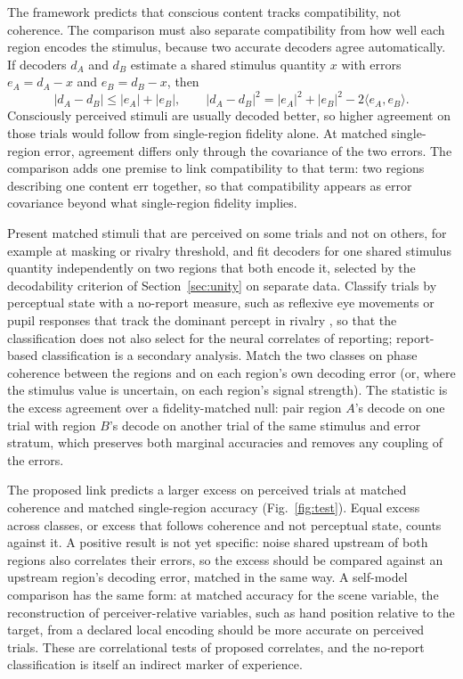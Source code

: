 \documentclass[12pt]{article}
\renewcommand{\cite}[1]{\citep{#1}}
\begin{document}
The framework predicts that conscious content tracks compatibility, not
coherence. The comparison must also separate compatibility from how well each
region encodes the stimulus, because two accurate decoders agree
automatically. If decoders $d_A$ and $d_B$ estimate a shared stimulus quantity
$x$ with errors $e_A=d_A-x$ and $e_B=d_B-x$, then
\begin{equation}
 |d_A-d_B|\leq|e_A|+|e_B|,
 \qquad
 |d_A-d_B|^2=|e_A|^2+|e_B|^2-2\langle e_A,e_B\rangle.
 \label{eq:agreement-decomposition}
\end{equation}
Consciously perceived stimuli are usually decoded better, so higher agreement
on those trials would follow from single-region fidelity alone. At matched
single-region error, agreement differs only through the covariance of the two
errors. The comparison adds one premise to link compatibility to that term:
two regions describing one content err together, so that compatibility
appears as error covariance beyond what single-region fidelity implies.

Present matched stimuli that are perceived on some trials and not on others,
for example at masking or rivalry threshold, and fit decoders for one shared
stimulus quantity independently on two regions that both encode it, selected by the decodability criterion of Section~\ref{sec:unity} on separate data. Classify
trials by perceptual state with a no-report measure, such as reflexive eye
movements or pupil responses that track the dominant percept in rivalry
\cite{tsuchiya2015}, so that the classification does not also select for the
neural correlates of reporting; report-based classification is a secondary
analysis. Match the two classes on phase coherence between the regions and on
each region's own decoding error (or, where the stimulus value is uncertain,
on each region's signal strength). The statistic is the excess agreement over
a fidelity-matched null: pair region $A$'s decode on one trial with region
$B$'s decode on another trial of the same stimulus and error stratum, which
preserves both marginal accuracies and removes any coupling of the errors.

The proposed link predicts a larger excess on perceived trials at matched
coherence and matched single-region accuracy (Fig.~\ref{fig:test}). Equal
excess across classes, or excess that follows coherence and not perceptual
state, counts against it. A positive result is not yet specific: noise shared
upstream of both regions also correlates their errors, so the excess should be
compared against an upstream region's decoding error, matched in the same way.
A self-model comparison has the same form: at matched accuracy for the scene
variable, the reconstruction of perceiver-relative variables, such as hand
position relative to the target, from a declared local encoding should be
more accurate on perceived trials. These are correlational tests of proposed
correlates, and the no-report classification is itself an indirect marker of
experience.
\end{document}
